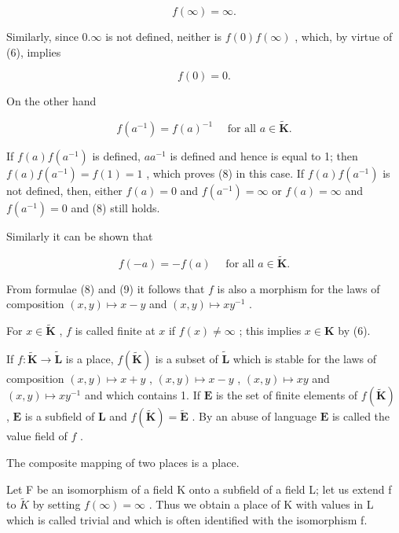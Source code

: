\[
f (\infty) = \infty .\tag{6}
\]

Similarly, since \(0.\infty\) is not defined, neither is \(f(0)f(\infty)\) , which, by virtue of (6), implies

\[
f (0) = 0.\tag{7}
\]

On the other hand

\[
f (a ^ {- 1}) = f (a) ^ {- 1} \quad \text {   for   all   } a \in \tilde {\mathbf {K}}.\tag{8}
\]

If \(f(a)f(a^{-1})\) is defined, \(aa^{-1}\) is defined and hence is equal to 1; then \(f(a)f(a^{-1}) = f(1) = 1\) , which proves (8) in this case. If \(f(a)f(a^{-1})\) is not defined, then, either \(f(a) = 0\) and \(f(a^{-1}) = \infty\) or \(f(a) = \infty\) and \(f(a^{-1}) = 0\) and (8) still holds.

Similarly it can be shown that

\[
f (- a) = - f (a) \quad \text {   for   all   } a \in \tilde {\mathbf {K}}.\tag{9}
\]

From formulae (8) and (9) it follows that \(f\) is also a morphism for the laws of composition \((x, y) \mapsto x - y\) and \((x, y) \mapsto xy^{-1}\) .

For \(x \in \tilde{\mathbf{K}}\) , \(f\) is called finite at \(x\) if \(f(x) \neq \infty\) ; this implies \(x \in \mathbf{K}\) by (6).

If \(f \colon \tilde{\mathbf{K}} \to \tilde{\mathbf{L}}\) is a place, \(f(\tilde{\mathbf{K}})\) is a subset of \(\tilde{\mathbf{L}}\) which is stable for the laws of composition \((x, y) \mapsto x + y\) , \((x, y) \mapsto x - y\) , \((x, y) \mapsto xy\) and \((x, y) \mapsto xy^{-1}\) and which contains 1. If \(\mathbf{E}\) is the set of finite elements of \(f(\tilde{\mathbf{K}})\) , \(\mathbf{E}\) is a subfield of \(\mathbf{L}\) and \(f(\tilde{\mathbf{K}}) = \tilde{\mathbf{E}}\) . By an abuse of language \(\mathbf{E}\) is called the value field of \(f\) .

The composite mapping of two places is a place.

Let F be an isomorphism of a field K onto a subfield of a field L; let us extend f to \(\tilde{K}\) by setting \(f(\infty) = \infty\) . Thus we obtain a place of K with values in L which is called trivial and which is often identified with the isomorphism f.

